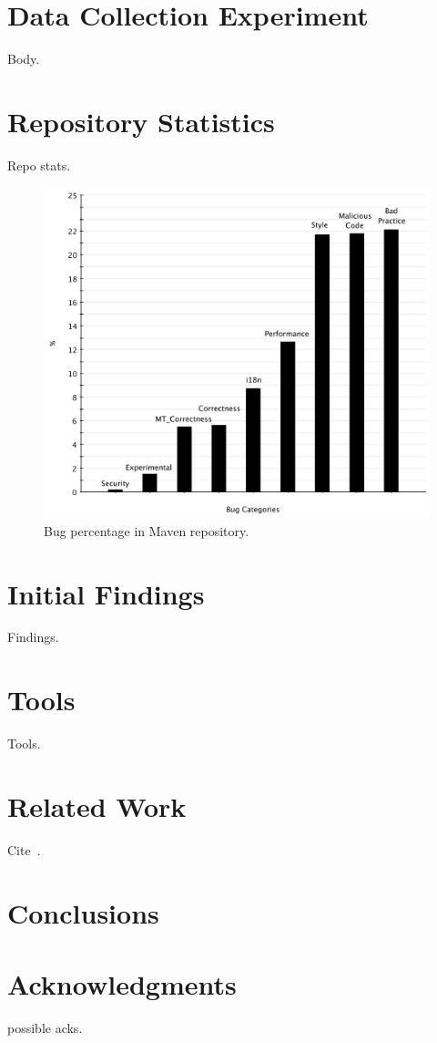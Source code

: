 \documentclass{sig-alternate}
\begin{document}
\section{Data Collection Experiment}
\label{sec:exp}
Body.

\section{Repository Statistics}
\label{sec:repo}
Repo stats.

\begin{figure}[t]
	\centering
	\includegraphics[scale=0.38]{figures/bug_percent}
	\caption{Bug percentage in Maven repository.}
	\label{fig:bug-per} 
\end{figure}

\section{Initial Findings}
\label{sec:find}
Findings.

\section{Tools}
\label{sec:exp}
Tools.

\section{Related Work}
\label{sec:rel}

Cite~\cite{RDV13}.

\section{Conclusions}
\label{sec:conc}

\section{Acknowledgments}
possible acks.


  
\end{document}
